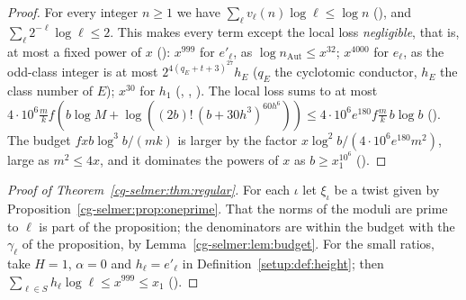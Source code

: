 \begin{proof}
For every integer $n\ge1$ we have $\sum_\ell v_\ell(n)\log\ell\le\log n$
(), and $\sum_\ell2^{-\ell}\log\ell\le2$. This makes
every term except the local loss \emph{negligible}, that is, at most a fixed power of $x$
(): $x^{999}$ for $e'_\ell$, as $\log n_{\mathrm{Aut}}\le x^{32}$; $x^{4000}$ for
$e_\ell$, as the odd-class integer is at most $2^{4(q_E+t+3)^{27}}h_E$ ($q_E$ the cyclotomic conductor,
$h_E$ the class number of $E$); $x^{30}$ for $h_1$ (,
,
). The local loss sums to at most
$4\cdot10^6\tfrac mk f(b\log M+\log((2b)!\,(b+30h^3)^{60h^6}))\le4\cdot10^6e^{180}f\tfrac mk\,b\log b$
(). The budget $f x b\log^3b/(mk)$ is larger by the
factor $x\log^2b/(4\cdot10^6e^{180}m^2)$, large as $m^2\le4x$, and it dominates the powers of $x$ as
$b\ge x_1^{10^6}$ ().
\end{proof}

\begin{proof}[Proof of Theorem~\ref{cg-selmer:thm:regular}]
For each $\iota$ let $\xi_\iota$ be a twist given by
Proposition~\ref{cg-selmer:prop:oneprime}. That the norms of the moduli are prime to $\ell$ is part
of the proposition; the denominators are within the budget with the $\gamma_\ell$ of the proposition,
by Lemma~\ref{cg-selmer:lem:budget}. For the small ratios, take $H=1$, $\alpha=0$ and
$h_\ell=e'_\ell$ in Definition~\ref{setup:def:height}; then $\sum_{\ell\in S}h_\ell\log\ell\le
x^{999}\le x_1$ ().
\end{proof}

